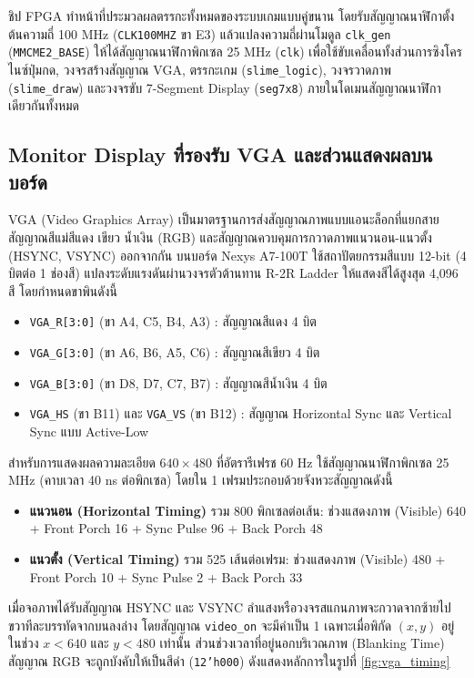 ชิป FPGA ทำหน้าที่ประมวลผลตรรกะทั้งหมดของระบบเกมแบบคู่ขนาน โดยรับสัญญาณนาฬิกาตั้งต้นความถี่ 100 MHz (\texttt{CLK100MHZ} ขา E3) แล้วแปลงความถี่ผ่านโมดูล \texttt{clk\_gen} (\texttt{MMCME2\_BASE}) ให้ได้สัญญาณนาฬิกาพิกเซล 25 MHz (\texttt{clk}) เพื่อใช้ขับเคลื่อนทั้งส่วนการซิงโครไนซ์ปุ่มกด, วงจรสร้างสัญญาณ VGA, ตรรกะเกม (\texttt{slime\_logic}), วงจรวาดภาพ (\texttt{slime\_draw}) และวงจรขับ 7-Segment Display (\texttt{seg7x8}) ภายในโดเมนสัญญาณนาฬิกาเดียวกันทั้งหมด

\subsection{Monitor Display ที่รองรับ VGA และส่วนแสดงผลบนบอร์ด}

VGA (Video Graphics Array) เป็นมาตรฐานการส่งสัญญาณภาพแบบแอนะล็อกที่แยกสายสัญญาณสีแม่สีแดง เขียว น้ำเงิน (RGB) และสัญญาณควบคุมการกวาดภาพแนวนอน-แนวตั้ง (HSYNC, VSYNC) ออกจากกัน บนบอร์ด Nexys A7-100T ใช้สถาปัตยกรรมสีแบบ 12-bit (4 บิตต่อ 1 ช่องสี) แปลงระดับแรงดันผ่านวงจรตัวต้านทาน R-2R Ladder ให้แสดงสีได้สูงสุด 4,096 สี โดยกำหนดขาพินดังนี้

\begin{itemize}[leftmargin=1.5cm]
    \item \texttt{VGA\_R[3:0]} (ขา A4, C5, B4, A3) : สัญญาณสีแดง 4 บิต
    \item \texttt{VGA\_G[3:0]} (ขา A6, B6, A5, C6) : สัญญาณสีเขียว 4 บิต
    \item \texttt{VGA\_B[3:0]} (ขา D8, D7, C7, B7) : สัญญาณสีน้ำเงิน 4 บิต
    \item \texttt{VGA\_HS} (ขา B11) และ \texttt{VGA\_VS} (ขา B12) : สัญญาณ Horizontal Sync และ Vertical Sync แบบ Active-Low
\end{itemize}

สำหรับการแสดงผลความละเอียด $640\times480$ ที่อัตรารีเฟรช 60 Hz ใช้สัญญาณนาฬิกาพิกเซล 25 MHz (คาบเวลา 40 ns ต่อพิกเซล) โดยใน 1 เฟรมประกอบด้วยจังหวะสัญญาณดังนี้
\begin{itemize}[leftmargin=1.5cm]
    \item \textbf{แนวนอน (Horizontal Timing)} รวม 800 พิกเซลต่อเส้น: ช่วงแสดงภาพ (Visible) 640 + Front Porch 16 + Sync Pulse 96 + Back Porch 48
    \item \textbf{แนวตั้ง (Vertical Timing)} รวม 525 เส้นต่อเฟรม: ช่วงแสดงภาพ (Visible) 480 + Front Porch 10 + Sync Pulse 2 + Back Porch 33
\end{itemize}
เมื่อจอภาพได้รับสัญญาณ HSYNC และ VSYNC ลำแสงหรือวงจรสแกนภาพจะกวาดจากซ้ายไปขวาทีละบรรทัดจากบนลงล่าง โดยสัญญาณ \texttt{video\_on} จะมีค่าเป็น 1 เฉพาะเมื่อพิกัด $(x, y)$ อยู่ในช่วง $x < 640$ และ $y < 480$ เท่านั้น ส่วนช่วงเวลาที่อยู่นอกบริเวณภาพ (Blanking Time) สัญญาณ RGB จะถูกบังคับให้เป็นสีดำ (\texttt{12'h000}) ดังแสดงหลักการในรูปที่ \ref{fig:vga_timing}

